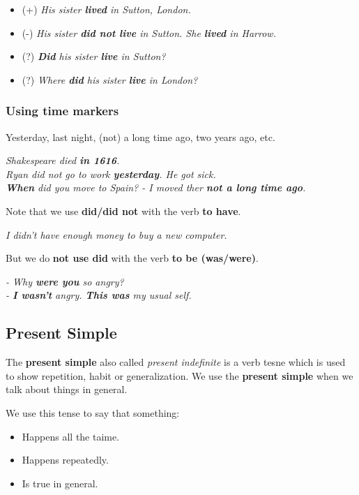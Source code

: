 \documentclass[hidelinks,10pt,a4paper]{article}
\begin{document}
\begin{itemize}
	\item (+) \textit{His sister \textbf{lived} in Sutton, London.}
	\item (-) \textit{His sister \textbf{did not live} in Sutton. She \textbf{lived} in Harrow. }
	\item (?) \textit{ \textbf{Did} his sister \textbf{live} in Sutton?  }
	\item (?) \textit{Where \textbf{did} his sister \textbf{live} in London?}
\end{itemize}

\subsubsection{Using time markers}

Yesterday, last night, (not) a long time ago, two years ago, etc.

\begin{center}
	\textit{Shakespeare died \textbf{in 1616}.\\
	Ryan did not go to work \textbf{yesterday}. He got sick. \\
	\textbf{When} did you move to Spain? - I moved ther \textbf{not a long time ago}. }
\end{center}

Note that we use \textbf{did/did not} with the verb \textbf{to have}.

\begin{center}
	\textit{I didn't have enough money to buy a new computer.}
\end{center}

But we do \textbf{not use did} with the verb \textbf{to be (was/were)}.

\begin{center}
	\textit{- Why \textbf{were you} so angry? \\
	- \textbf{I wasn't} angry. \textbf{This was} my usual self.}
\end{center}

\subsection{Present Simple}
The \textbf{present simple} also called \textit{present indefinite} is a verb tesne which is used to show repetition, habit or generalization. We use the \textbf{present simple} when we talk about things in general.

We use this tense to say that something:
\begin{itemize}
	\item Happens all the taime.
	\item Happens repeatedly.
	\item Is true in general.
\end{itemize}
\end{document}
